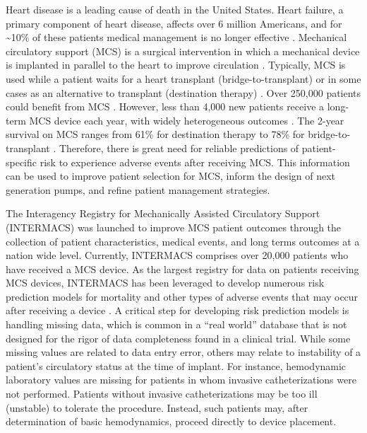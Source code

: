 \documentclass{article}
\begin{document}
\linenumbers
\doublespacing

Heart disease is a leading cause of death in the United States. Heart
failure, a primary component of heart disease, affects over 6 million
Americans, and for \textasciitilde10\% of these patients medical
management is no longer effective
\cite{benjamin2017heart,national2017health}. Mechanical circulatory
support (MCS) is a surgical intervention in which a mechanical device is
implanted in parallel to the heart to improve circulation
\cite{patel2014contemporary}. Typically, MCS is used while a patient
waits for a heart transplant (bridge-to-transplant) or in some cases as
an alternative to transplant (destination therapy)
\cite{slaughter2009advanced}. Over 250,000 patients could benefit from
MCS \cite{miller2011left}. However, less than 4,000 new patients receive
a long-term MCS device each year, with widely heterogeneous outcomes
\cite{stewart2011keeping}. The 2-year survival on MCS ranges from 61\%
for destination therapy to 78\% for bridge-to-transplant
\cite{patel2014contemporary}. Therefore, there is great need for
reliable predictions of patient-specific risk to experience adverse
events after receiving MCS. This information can be used to improve
patient selection for MCS, inform the design of next generation pumps,
and refine patient management strategies.

The Interagency Registry for Mechanically Assisted Circulatory Support
(INTERMACS) was launched to improve MCS patient outcomes through the
collection of patient characteristics, medical events, and long terms
outcomes at a nation wide level. Currently, INTERMACS comprises over
20,000 patients who have received a MCS device. As the largest registry
for data on patients receiving MCS devices, INTERMACS has been leveraged
to develop numerous risk prediction models for mortality and other types
of adverse events that may occur after receiving a device
\cite{kirklin2017eighth, kormos2019society, Adamo950}. A critical step
for developing risk prediction models is handling missing data, which is
common in a ``real world'' database that is not designed for the rigor
of data completeness found in a clinical trial. While some missing
values are related to data entry error, others may relate to instability
of a patient's circulatory status at the time of implant. For instance,
hemodynamic laboratory values are missing for patients in whom invasive
catheterizations were not performed. Patients without invasive
catheterizations may be too ill (unstable) to tolerate the procedure.
Instead, such patients may, after determination of basic hemodynamics,
proceed directly to device placement.
\end{document}
